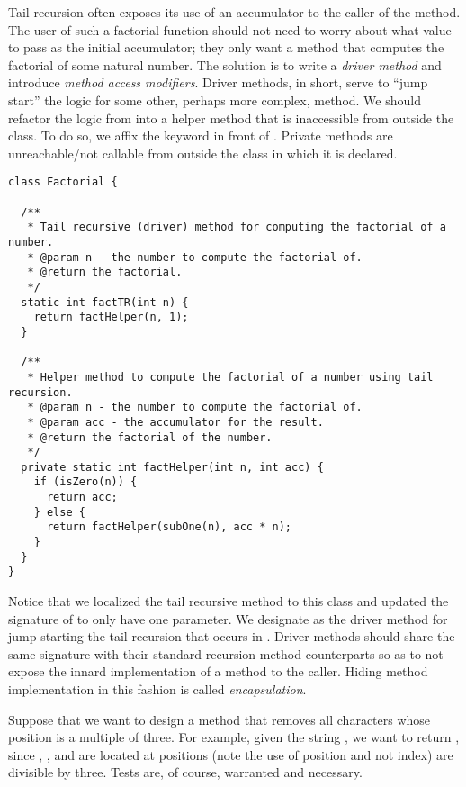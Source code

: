 Tail recursion often exposes its use of an accumulator to the caller of the method. 
The user of such a factorial function should not need to worry about what value to pass as the initial accumulator; they only want a method that computes the factorial of some natural number. 
The solution is to write a \emph{driver method} and introduce \emph{method access modifiers}. 
Driver methods, in short, serve to ``jump start'' the logic for some other, perhaps more complex, method. 
We should refactor the logic from  into a helper method that is inaccessible from outside the class. 
To do so, we affix the  keyword in front of . 
Private methods are unreachable/not callable from outside the class in which it is declared.

\begin{lstlisting}[language=MyJava]
class Factorial {
  
  /**
   * Tail recursive (driver) method for computing the factorial of a number.
   * @param n - the number to compute the factorial of.
   * @return the factorial.
   */
  static int factTR(int n) {
    return factHelper(n, 1);
  }

  /**
   * Helper method to compute the factorial of a number using tail recursion.
   * @param n - the number to compute the factorial of.
   * @param acc - the accumulator for the result.
   * @return the factorial of the number.
   */
  private static int factHelper(int n, int acc) {
    if (isZero(n)) {
      return acc;
    } else {
      return factHelper(subOne(n), acc * n);
    }
  }
}
\end{lstlisting}

Notice that we localized the tail recursive method to this class and updated the signature of  to only have one parameter. 
We designate  as the driver method for jump-starting the tail recursion that occurs in . 
Driver methods should share the same signature with their standard recursion method counterparts so as to not expose the innard implementation of a method to the caller. 
Hiding method implementation in this fashion is called \emph{encapsulation}. 

Suppose that we want to design a method that removes all characters whose position is a multiple of three. 
For example, given the string , we want to return , since , , and  are located at positions (note the use of position and not index) are divisible by three. 
Tests are, of course, warranted and necessary.

